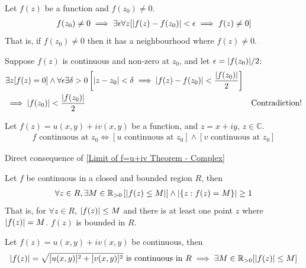 \documentclass[12pt, english]{book}
\makeatletter
\renewenvironment{proof}[1][\proofname]{\par
	\pushQED{\qed}%
	\normalfont \topsep6\p@\@plus6\p@\relax
	\list{}{%
		\settowidth{\leftmargin}{\itshape\proofname:\hskip\labelsep}%
		\setlength{\labelwidth}{0pt}%
		\setlength{\itemindent}{-\leftmargin}%
		}%
	\item[\hskip\labelsep\itshape#1\@addpunct{:}]\ignorespaces
	}{\popQED\endlist\@endpefalse}
\makeatother
\begin{document}
	\begin{theorem}
		\label{f(z) neq 0 Neighbourhood Theorem - Complex}
		Let $f(z)$ be a function and $f(z_0) \neq 0$.
		\begin{align*}
			f(z_0) \neq 0 
			\implies \exists \epsilon \forall z [\abs{f(z) - f(z_0)}<\epsilon \implies f(z) \neq 0]
		\end{align*}
		That is, if $f(z_0) \neq 0$ then it has a neighbourhood where $f(z) \neq 0$.
	\end{theorem}
	\begin{proof}
		Suppose $f(z)$ is continuous and non-zero at $z_0$, and let $\epsilon = \abs{f(z_0)}/2$:
		\begin{align*}
			&\exists z [f(z) = 0]  \land 
			\forall \epsilon \exists \delta>0 \left[ \abs{z-z_0}<\delta \implies \abs{f(z) - f(z_0)}  < \frac{\abs{f(z_0)}}{2} \right] & \\
			&\implies \abs{f(z_0)} < \frac{\abs{f(z_0)}}{2} & \text{Contradiction!}
		\end{align*}
	\end{proof}

	\begin{theorem}
		Let $f(z) = u(x,y) + iv(x,y)$ be a function, and $z = x + iy$, $z \in \mathbb{C}$. 
		\begin{align*}
			f \text{ continuous at } z_0 \iff \left[ u \text{ continuous at } z_0 \right] \land \left[ v \text{ continuous at } z_0 \right]
		\end{align*}
		\label{Continuity of f=u+iv Theorem - Complex}
	\end{theorem}
	\begin{proof}
		Direct consequence of \cref{Limit of f=u+iv Theorem - Complex}
	\end{proof}
	
	\begin{theorem}
		\label{Function continuous in closed and bounded region implies function is bounded Theorem - Complex}
		Let $f$ be continuous in a closed and bounded region $R$, then
		\begin{align*}
			\forall z \in R, \exists M \in \mathbb{R}_{>0}  \left[\abs{f(z) \leq M}\right] 
			\land \abs{\{z : f(z) = M \}} \geq 1
		\end{align*}
		That is, for $\forall z \in R$, $\abs{f(z)} \leq M$ and there is at least one point $z$ where $\abs{f(z)}= M$. $f(z)$ is bounded in $R$.
	\end{theorem}
	\begin{proof}
		Let $f(z) = u(x,y) + iv(x,y)$ be continuous, then 
		\begin{align*}
			\abs{f(z)} = \sqrt{[u(x,y)]^2 + [v(x,y)]^2} \text{ is continuous in } R 
			\implies \exists M \in \mathbb{R}_{>0} [\abs{f(z)}\leq M]
		\end{align*}
	\end{proof}
\end{document}
